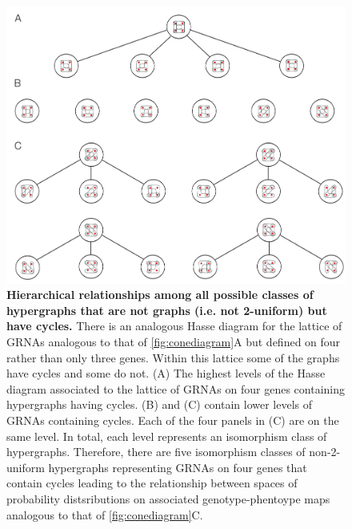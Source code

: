 \begin{figure}[!ht]
\centering
\noindent\includegraphics[width=0.7\columnwidth]{fig/non2uniformcyclichypergraphhasse.pdf}
\caption{{\bf Hierarchical relationships among all possible classes of hypergraphs that are not graphs (i.e. not 2-uniform) but have cycles.} There is an analogous Hasse diagram for the lattice of GRNAs analogous to that of \ref{fig:conediagram}A but defined on four rather than only three genes. Within this lattice some of the graphs have cycles and some do not. (A) The highest levels of the Hasse diagram associated to the lattice of GRNAs on four genes containing hypergraphs having cycles. (B) and (C) contain lower levels of GRNAs containing cycles. Each of the four panels in (C) are on the same level. In total, each level represents an isomorphism class of hypergraphs. Therefore, there are five isomorphism classes of non-2-uniform hypergraphs representing GRNAs on four genes that contain cycles leading to the relationship between spaces of probability distsributions on associated genotype-phentoype maps analogous to that of \ref{fig:conediagram}C.}
\label{fig:non2uniformcyclichypergraphhasse}
\end{figure}

